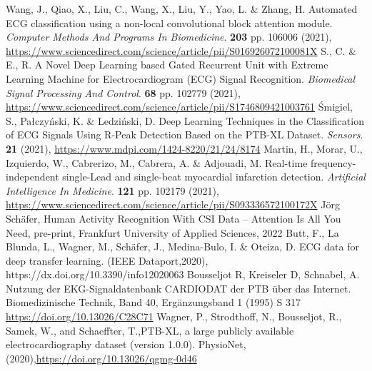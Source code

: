 \documentclass{ieeeaccess}
\begin{document}
\begin{thebibliography}{1}
 Wang, J., Qiao, X., Liu, C., Wang, X., Liu, Y., Yao, L. \& Zhang, H. Automated ECG classification using a non-local convolutional block attention module. {\em Computer Methods And Programs In Biomedicine}. \textbf{203} pp. 106006 (2021), \url{https://www.sciencedirect.com/science/article/pii/S016926072100081X}
S., C. \& E., R. A Novel Deep Learning based Gated Recurrent Unit with Extreme Learning Machine for Electrocardiogram (ECG) Signal Recognition. {\em Biomedical Signal Processing And Control}. \textbf{68} pp. 102779 (2021), \url{https://www.sciencedirect.com/science/article/pii/S1746809421003761}
Śmigiel, S., Pałczyński, K. \& Ledziński, D. Deep Learning Techniques in the Classification of ECG Signals Using R-Peak Detection Based on the PTB-XL Dataset. {\em Sensors}. \textbf{21} (2021), \url{https://www.mdpi.com/1424-8220/21/24/8174}
Martin, H., Morar, U., Izquierdo, W., Cabrerizo, M., Cabrera, A. \& Adjouadi, M. Real-time frequency-independent single-Lead and single-beat myocardial infarction detection. {\em Artificial Intelligence In Medicine}. \textbf{121} pp. 102179 (2021), \url{https://www.sciencedirect.com/science/article/pii/S093336572100172X}
Jörg Schäfer, Human Activity Recognition With CSI Data -- Attention Is All You Need, pre-print, Frankfurt University of Applied Sciences, 2022
Butt, F., La Blunda, L., Wagner, M., Schäfer, J., Medina-Bulo, I. \& Oteiza, D. ECG data for deep transfer learning. (IEEE Dataport,2020), https://dx.doi.org/10.3390/info12020063
Bousseljot R, Kreiseler D, Schnabel, A. Nutzung der EKG-Signaldatenbank CARDIODAT der PTB über das Internet. Biomedizinische Technik, Band 40, Ergänzungsband 1 (1995) S 317 \url{https://doi.org/10.13026/C28C71}
Wagner, P., Strodthoff, N., Bousseljot, R., Samek, W., and Schaeffter, T.,PTB-XL, a large publicly available electrocardiography dataset (version 1.0.0). PhysioNet, (2020),\url{https://doi.org/10.13026/qgmg-0d46}
\end{thebibliography}
\end{document}
